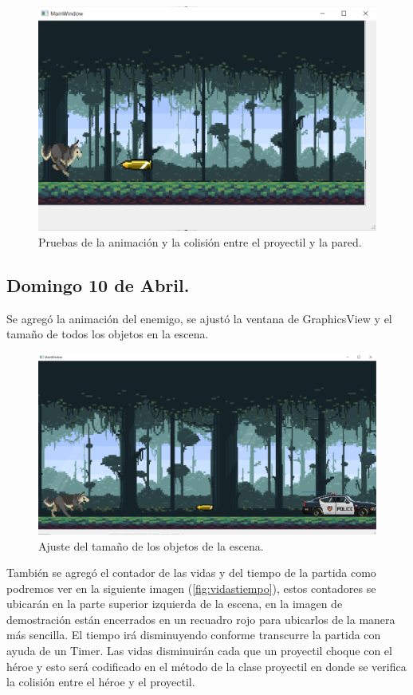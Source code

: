 \documentclass{article}
\begin{document}
\begin{figure}[h]
\includegraphics[scale=0.55]{Images/proyectil2.png}
\centering
\caption{Pruebas de la animación y la colisión entre el proyectil y la pared.}
\label{fig:proyectil2}
\end{figure}

\subsection{Domingo 10 de Abril.}
Se agregó la animación del enemigo, se ajustó la ventana de GraphicsView y el tamaño de todos los objetos en la escena.

\newpage
\begin{figure}[h]
\includegraphics[scale=0.3]{Images/tamaniobjetosajustado.png}
\centering
\caption{Ajuste del tamaño de los objetos de la escena.}
\label{fig:ajustetamanio}
\end{figure}

También se agregó el contador de las vidas y del tiempo de la partida como podremos ver en la siguiente imagen (\ref{fig:vidastiempo}), estos contadores se ubicarán en la parte superior izquierda de la escena, en la imagen de demostración están encerrados en un recuadro rojo para ubicarlos de la manera más sencilla. El tiempo irá disminuyendo conforme transcurre la partida con ayuda de un Timer. Las vidas disminuirán cada que un proyectil choque con el héroe y esto será codificado en el método de la clase proyectil en donde se verifica la colisión entre el héroe y el proyectil.
\end{document}
